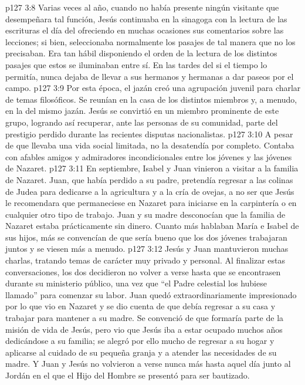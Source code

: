 \vs p127 3:8 Varias veces al año, cuando no había presente ningún visitante que desempeñara tal función, Jesús continuaba en la sinagoga con la lectura de las escrituras el día del  ofreciendo en muchas ocasiones sus comentarios sobre las lecciones; si bien, seleccionaba normalmente los pasajes de tal manera que no los precisaban. Era tan hábil disponiendo el orden de la lectura de los distintos pasajes que estos se iluminaban entre sí. En las tardes del  si el tiempo lo permitía, nunca dejaba de llevar a sus hermanos y hermanas a dar paseos por el campo.
\vs p127 3:9 Por esta época, el jazán creó una agrupación juvenil para charlar de temas filosóficos. Se reunían en la casa de los distintos miembros y, a menudo, en la del mismo jazán. Jesús se convirtió en un miembro prominente de este grupo, logrando así recuperar, ante las personas de su comunidad, parte del prestigio perdido durante las recientes disputas nacionalistas.
\vs p127 3:10 A pesar de que llevaba una vida social limitada, no la desatendía por completo. Contaba con afables amigos y admiradores incondicionales entre los jóvenes y las jóvenes de Nazaret.
\vs p127 3:11 \pc En septiembre, Isabel y Juan vinieron a visitar a la familia de Nazaret. Juan, que había perdido a su padre, pretendía regresar a las colinas de Judea para dedicarse a la agricultura y a la cría de ovejas, a no ser que Jesús le recomendara que permaneciese en Nazaret para iniciarse en la carpintería o en cualquier otro tipo de trabajo. Juan y su madre desconocían que la familia de Nazaret estaba prácticamente sin dinero. Cuanto más hablaban María e Isabel de sus hijos, más se convencían de que sería bueno que los dos jóvenes trabajaran juntos y se viesen más a menudo.
\vs p127 3:12 Jesús y Juan mantuvieron muchas charlas, tratando temas de carácter muy privado y personal. Al finalizar estas conversaciones, los dos decidieron no volver a verse hasta que se encontrasen durante su ministerio público, una vez que “el Padre celestial los hubiese llamado” para comenzar su labor. Juan quedó extraordinariamente impresionado por lo que vio en Nazaret y se dio cuenta de que debía regresar a su casa y trabajar para mantener a su madre. Se convenció de que formaría parte de la misión de vida de Jesús, pero vio que Jesús iba a estar ocupado muchos años dedicándose a su familia; se alegró por ello mucho de regresar a su hogar y aplicarse al cuidado de su pequeña granja y a atender las necesidades de su madre. Y Juan y Jesús no volvieron a verse nunca más hasta aquel día junto al Jordán en el que el Hijo del Hombre se presentó para ser bautizado.
